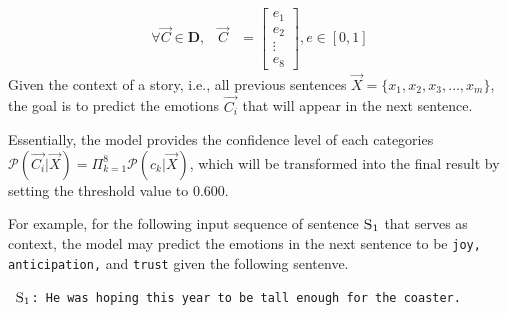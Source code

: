 \documentclass{article} %
\begin{document}
\begin{align}
    \forall \vec{C} \in \mathbf{D}, \hspace{10pt} \vec{C} &= \begin{bmatrix}
                                                e_{1} \\
                                                e_{2} \\
                                                \vdots \\
                                                e_{8}
                                                \end{bmatrix}, 
    e \in [0, 1]
\end{align}
\noindent Given the context of a story, i.e., all previous sentences $\vec{X} = \{x_1, x_2, x_3, \dots, x_m\}$, the goal is to predict the emotions $\vec{C_i}$ that will appear in the next sentence. 


Essentially, the model provides the confidence level of each categories $\mathcal{P}(\vec{C_i} | \vec{X}) = \Pi^8_{k=1}\mathcal{P}(c_k | \vec{X})$, which will be transformed into the final result by setting the threshold value to $0.600$. 

For example, for the following input sequence of sentence $\textsc{S}_1$ that serves as context, the model may predict the emotions in the next sentence to be \texttt{joy, anticipation,} and \texttt{trust} given the following sentenve.

\begin{center}
    \texttt{
    $\textsc{S}_1$: He was hoping this year to be tall enough for the coaster.
    }
\end{center}
\end{document}
